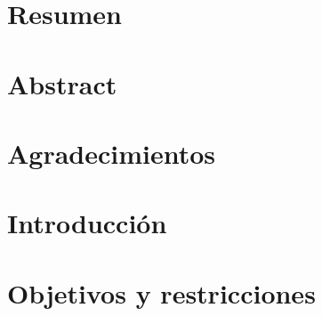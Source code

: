 \documentclass[11pt,twoside]{docs/thesis}
\begin{document}
{}
\makecoverletter
\makeficha
\chapter*{Resumen}  
\chapter*{Abstract} 

\maketitle

\chapter*{Agradecimientos} 

\makenomenclature





\tableofcontents %
\listoffigures 	  %
\renewcommand\listtablename{Índice de tablas}
\listoftables     %
\clearpage %
\mainmatter       %

\dominitoc
\cleardoublepage

\chapter{Introducción}



\chapter{Objetivos y restricciones} \label{Objs}

\end{document}
